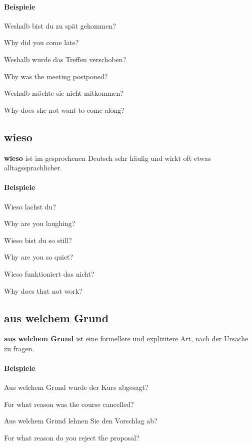 \documentclass[a4paper]{article}
\newcommand{\EN}[1]{\par{\small\textcolor{TranslationGray}{#1}}\vspace{0.25em}}
\begin{document}
    \paragraph{Beispiele}
        Weshalb bist du zu spät gekommen?\\
        \EN{Why did you come late?}
        
        Weshalb wurde das Treffen verschoben?\\
        \EN{Why was the meeting postponed?}
        
        Weshalb möchte sie nicht mitkommen?\\
        \EN{Why does she not want to come along?}
    
    \subsection{wieso}
    \textbf{wieso} ist im gesprochenen Deutsch sehr häufig und wirkt oft etwas alltagssprachlicher.
    
    \paragraph{Beispiele}
        Wieso lachst du?\\
        \EN{Why are you laughing?}
        
        Wieso bist du so still?\\
        \EN{Why are you so quiet?}
        
        Wieso funktioniert das nicht?\\
        \EN{Why does that not work?}
    
    \subsection{aus welchem Grund}
    \textbf{aus welchem Grund} ist eine formellere und explizitere Art, nach der Ursache zu fragen.
    
    \paragraph{Beispiele}
        Aus welchem Grund wurde der Kurs abgesagt?\\
        \EN{For what reason was the course cancelled?}
        
        Aus welchem Grund lehnen Sie den Vorschlag ab?\\
        \EN{For what reason do you reject the proposal?}
        
\end{document}
